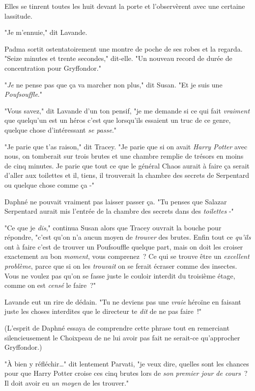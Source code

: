 Elles se tinrent toutes les huit devant la porte et l'observèrent avec une certaine lassitude.

"Je m'ennuie," dit Lavande.

Padma sortit ostentatoirement une montre de poche de ses robes et la regarda. "Seize minutes et trente secondes," dit-elle. "Un nouveau record de durée de concentration pour Gryffondor."

"\emph{Je} ne pense pas que ça va marcher non plus," dit Susan. "Et je suis une \emph{Poufsouffle}."

"Vous savez," dit Lavande d'un ton pensif, "je me demande si ce qui fait \emph{vraiment} que quelqu'un est un héros c'est que lorsqu'ils essaient un truc de ce genre, quelque chose d'intéressant \emph{se passe}."

"Je parie que t'as raison," dit Tracey. "Je parie que si on avait \emph{Harry Potter} avec nous, on tomberait sur trois brutes et une chambre remplie de trésors en moins de cinq minutes. Je parie que tout ce que le général Chaos aurait à faire ça serait d'aller aux toilettes et il, tiens, il trouverait la chambre des secrets de Serpentard ou quelque chose comme ça -"

Daphné ne pouvait vraiment pas laisser passer ça. "Tu penses que Salazar Serpentard aurait mis l'entrée de la chambre des secrets dans des \emph{toilettes} -"

"Ce que je \emph{dis}," continua Susan alors que Tracey ouvrait la bouche pour répondre, "c'est qu'on n'a aucun moyen de \emph{trouver} des brutes. Enfin tout ce \emph{qu'ils} ont à faire c'est de trouver un Poufsouffle quelque part, mais on doit les croiser exactement au bon \emph{moment}, vous comprenez~? Ce qui se trouve être un \emph{excellent problème}, parce que si on les \emph{trouvait} on se ferait écraser comme des insectes. Vous ne voulez pas qu'on se fasse juste le couloir interdit du troisième étage, comme on est \emph{censé} le faire~?"

Lavande eut un rire de dédain. "Tu ne deviens pas une \emph{vraie} héroïne en faisant juste les choses interdites que le directeur te \emph{dit} de ne pas faire~!"

(L'esprit de Daphné essaya de comprendre cette phrase tout en remerciant silencieusement le Choixpeau de ne lui avoir pas fait ne serait-ce qu'approcher Gryffondor.)

"À bien y réfléchir…" dit lentement Parvati, "je veux dire, quelles sont les chances pour que Harry Potter croise ces cinq brutes lors de \emph{son premier jour de cours}~? Il doit avoir eu \emph{un moyen} de les trouver."

